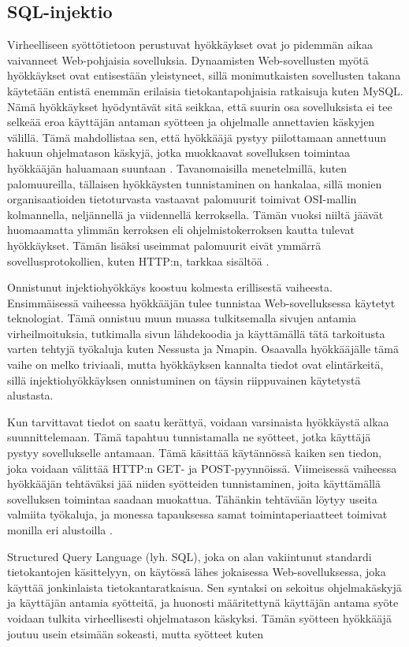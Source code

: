 \subsection{SQL-injektio}

Virheelliseen syöttötietoon perustuvat hyökkäykset ovat jo pidemmän aikaa vaivanneet Web-pohjaisia sovelluksia.
Dynaamisten Web-sovellusten myötä hyökkäykset ovat entisestään yleistyneet, sillä monimutkaisten sovellusten takana käytetään entistä
enemmän erilaisia tietokantapohjaisia ratkaisuja kuten MySQL. Nämä hyökkäykset hyödyntävät sitä seikkaa, että suurin osa
sovelluksista ei tee selkeää eroa käyttäjän antaman syötteen ja ohjelmalle annettavien käskyjen välillä. Tämä mahdollistaa
sen, että hyökkääjä pystyy piilottamaan annettuun hakuun ohjelmatason käskyjä, jotka muokkaavat sovelluksen toimintaa
hyökkääjän haluamaan suuntaan \cite{WEB2}. Tavanomaisilla
menetelmillä, kuten palomuureilla, tällaisen hyökkäysten tunnistaminen on hankalaa, sillä
monien organisaatioiden tietoturvasta vastaavat palomuurit toimivat OSI-mallin
kolmannella, neljännellä ja viidennellä kerroksella. Tämän vuoksi
niiltä jäävät huomaamatta ylimmän kerroksen eli ohjelmistokerroksen
kautta tulevat hyökkäykset. Tämän lisäksi useimmat palomuurit eivät
ymmärrä sovellusprotokollien,
kuten HTTP:n, tarkkaa sisältöä \cite{SQLSS}.    

Onnistunut injektiohyökkäys koostuu kolmesta erillisestä vaiheesta. Ensimmäisessä vaiheessa hyökkääjän tulee tunnistaa 
Web-sovelluksessa käytetyt teknologiat. Tämä onnistuu muun muassa tulkitsemalla sivujen antamia virheilmoituksia, tutkimalla 
sivun lähdekoodia ja käyttämällä tätä tarkoitusta varten tehtyjä työkaluja kuten Nessusta ja Nmapin. Osaavalla hyökkääjälle tämä vaihe on melko triviaali, 
mutta hyökkäyksen kannalta tiedot ovat elintärkeitä, sillä injektiohyökkäyksen onnistuminen on täysin riippuvainen 
käytetystä alustasta.

Kun tarvittavat tiedot on saatu kerättyä, voidaan varsinaista hyökkäystä alkaa suunnittelemaan.
Tämä tapahtuu tunnistamalla ne syötteet, jotka käyttäjä pystyy sovellukselle antamaan. Tämä käsittää käytännössä kaiken sen 
tiedon, joka voidaan välittää HTTP:n GET- ja POST-pyynnöissä. Viimeisessä vaiheessa hyökkääjän tehtäväksi jää niiden syötteiden 
tunnistaminen, joita käyttämällä sovelluksen toimintaa saadaan muokattua. Tähänkin tehtävään löytyy useita valmiita työkaluja, ja
monessa tapauksessa samat toimintaperiaatteet toimivat monilla eri alustoilla \cite{WEB2}.

Structured Query Language (lyh. SQL), joka on alan vakiintunut standardi tietokantojen käsittelyyn, on käytössä lähes jokaisessa
Web-\-sovelluksessa, joka käyttää jonkinlaista tietokantaratkaisua. Sen syntaksi on sekoitus ohjelmakäskyjä ja käyttäjän antamia
syötteitä, ja huonosti määritettynä käyttäjän antama syöte voidaan tulkita virheellisesti ohjelmatason käskyksi. Tämän syötteen
hyökkääjä joutuu usein etsimään sokeasti, mutta syötteet kuten

